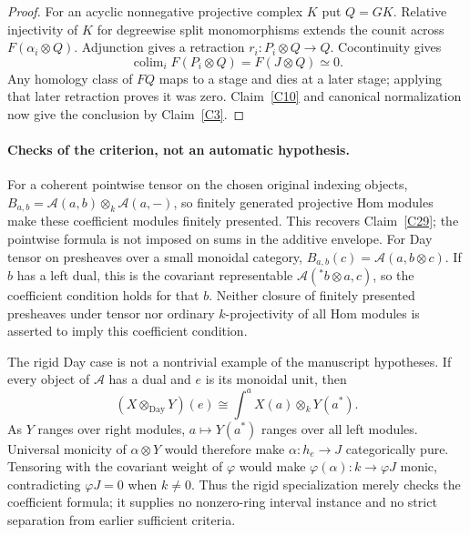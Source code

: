 \begin{proof}
For an acyclic nonnegative projective complex $K$ put $Q=GK$. Relative injectivity of $K$ for degreewise split monomorphisms extends the counit across $F(\alpha_i\otimes Q)$. Adjunction gives a retraction $r_i:P_i\otimes Q\to Q$. Cocontinuity gives
\[
 \operatorname{colim}_iF(P_i\otimes Q)=F(J\otimes Q)\simeq0.
\]
Any homology class of $FQ$ maps to a stage and dies at a later stage; applying that later retraction proves it was zero. Claim~\ref{C10} and canonical normalization now give the conclusion by Claim~\ref{C3}.
\end{proof}

\paragraph{Checks of the criterion, not an automatic hypothesis.}
For a coherent pointwise tensor on the chosen original indexing objects, $B_{a,b}=\mathcal A(a,b)\otimes_k\mathcal A(a,-)$, so finitely generated projective Hom modules make these coefficient modules finitely presented. This recovers Claim~\ref{C29}; the pointwise formula is not imposed on sums in the additive envelope. For Day tensor on presheaves over a small monoidal category, $B_{a,b}(c)=\mathcal A(a,b\otimes c)$. If $b$ has a left dual, this is the covariant representable $\mathcal A({}^*b\otimes a,c)$, so the coefficient condition holds for that $b$. Neither closure of finitely presented presheaves under tensor nor ordinary $k$-projectivity of all Hom modules is asserted to imply this coefficient condition.

The rigid Day case is not a nontrivial example of the manuscript hypotheses. If every object of $\mathcal A$ has a dual and $e$ is its monoidal unit, then
\[
 (X\otimes_{\mathrm{Day}}Y)(e)
 \cong\int^{a} X(a)\otimes_kY(a^*).
\]
As $Y$ ranges over right modules, $a\mapsto Y(a^*)$ ranges over all left modules. Universal monicity of $\alpha\otimes Y$ would therefore make $\alpha:h_e\to J$ categorically pure. Tensoring with the covariant weight of $\varphi$ would make $\varphi(\alpha):k\to\varphi J$ monic, contradicting $\varphi J=0$ when $k\ne0$. Thus the rigid specialization merely checks the coefficient formula; it supplies no nonzero-ring interval instance and no strict separation from earlier sufficient criteria.
